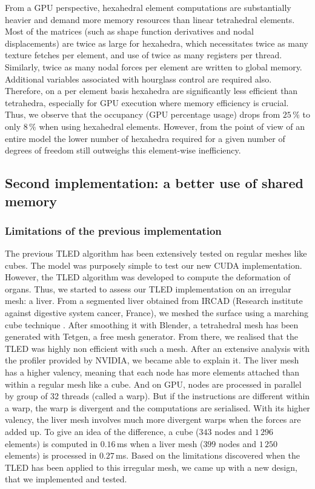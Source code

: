 From a GPU perspective, hexahedral element computations are substantially heavier and demand more memory resources than linear tetrahedral elements. Most of the matrices (such as shape function derivatives and nodal displacements) are twice as large for hexahedra, which necessitates twice as many texture fetches per element, and use of twice as many registers per thread. Similarly, twice as many nodal forces per element are written to global memory. Additional variables associated with hourglass control are required also. Therefore, on a per element basis hexahedra are significantly less efficient than tetrahedra, especially for GPU execution where memory efficiency is crucial. Thus, we observe that the occupancy (GPU percentage usage) drops from $25\,\%$ to only $8\,\%$ when using hexahedral elements. However, from the point of view of an entire model the lower number of hexahedra required for a given number of degrees of freedom still outweighs this element-wise inefficiency.


	\subsection{Second implementation: a better use of shared memory}

\subsubsection*{Limitations of the previous implementation}
The previous TLED algorithm has been extensively tested on regular meshes like cubes. The model was purposely simple to test our new CUDA implementation. However, the TLED algorithm was developed to compute the deformation of organs. Thus, we started to assess our TLED implementation on an irregular mesh: a liver. From a segmented liver obtained from IRCAD (Research institute against digestive system cancer, France), we meshed the surface using a marching cube technique \citep{Lorensen87}. After smoothing it with Blender, a tetrahedral mesh has been generated with Tetgen, a free mesh generator. From there, we realised that the TLED was highly non efficient with such a mesh. After an extensive analysis with the profiler provided by NVIDIA, we became able to explain it. The liver mesh has a higher valency, meaning that each node has more elements attached than within a regular mesh like a cube. And on GPU, nodes are processed in parallel by group of 32 threads (called a warp). But if the instructions are different within a warp, the warp is divergent and the computations are serialised. With its higher valency, the liver mesh involves much more divergent warps when the forces are added up. To give an idea of the difference, a cube ($343$ nodes and $1\,296$ elements) is computed in $0.16\,$ms when a liver mesh ($399$ nodes and $1\,250$ elements) is processed in $0.27\,$ms. Based on the limitations discovered when the TLED has been applied to this irregular mesh, we came up with a new design, that we implemented and tested.

